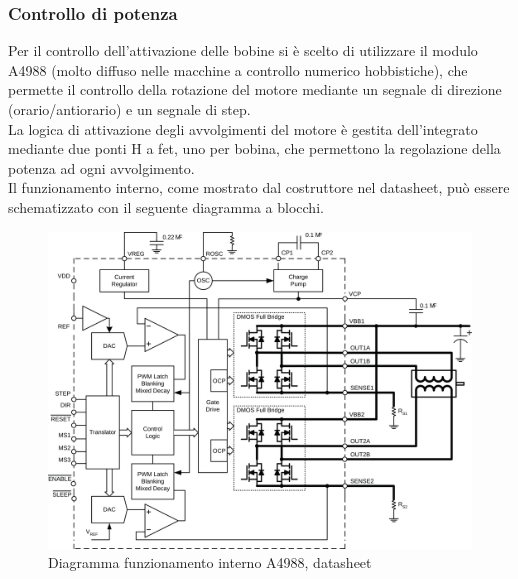 \documentclass[12pt]{article}
\begin{document}
    \vfill
    
    
        \subsubsection{Controllo di potenza}
        Per il controllo dell'attivazione delle bobine si è scelto di utilizzare il modulo A4988 (molto diffuso nelle macchine a controllo numerico hobbistiche), che permette il controllo della rotazione del motore mediante un segnale di direzione (orario/antiorario) e un segnale di step.\\
        La logica di attivazione degli avvolgimenti del motore è gestita dell'integrato mediante due ponti H a fet, uno per bobina, che permettono la regolazione della potenza ad ogni avvolgimento.\\
        Il funzionamento interno, come mostrato dal costruttore nel datasheet, può essere schematizzato con il seguente diagramma a blocchi.\\
        \begin{figure}[h]
        \centering
            \includegraphics[width=370pt]{Draws/A4988_functional_diagram.png}
            \caption{Diagramma funzionamento interno A4988, datasheet}
            \label{fig:A4988_diagram}
        \end{figure}
        
\end{document}
